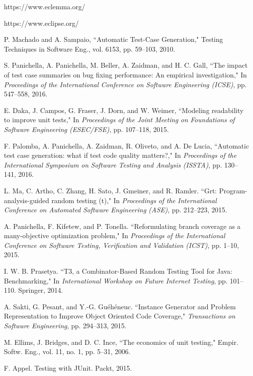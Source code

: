 \documentclass[conference]{IEEEtran}
\begin{document}
\begin{thebibliography}{15}
 https://www.eclemma.org/

 https://www.eclipse.org/

 P. Machado and A. Sampaio, ``Automatic Test-Case Generation," Testing Techniques in Software Eng., vol. 6153, pp. 59--103, 2010. 

 S. Panichella, A. Panichella, M. Beller, A. Zaidman, and H. C. Gall, ``The impact of test case summaries on bug fixing performance: An empirical investigation," In {\it Proceedings of the International Conference on Software Engineering (ICSE)}, pp. 547--558, 2016.

 E. Daka, J. Campos, G. Fraser, J. Dorn, and W. Weimer, ``Modeling readability to improve unit tests," In {\it Proceedings of the Joint Meeting on Foundations of Software Engineering (ESEC/FSE)}, pp. 107--118, 2015.

 F. Palomba, A. Panichella, A. Zaidman, R. Oliveto, and A. De Lucia, ``Automatic test case generation: what if test code quality matters?," In {\it Proceedings of the International Symposium on Software Testing and Analysis (ISSTA)}, pp. 130--141, 2016.

 L. Ma, C. Artho, C. Zhang, H. Sato, J. Gmeiner, and R. Ramler. ``Grt: Program-analysis-guided random testing (t)," In {\it Proceedings of the International Conference on Automated Software Engineering (ASE)}, pp. 212--223, 2015.

 A. Panichella, F. Kifetew, and P. Tonella. ``Reformulating branch coverage as a many-objective optimization problem," In {\it Proceedings of the International Conference on Software Testing, Verification and Validation (ICST)}, pp. 1--10, 2015. 

 I. W. B. Prasetya. ``T3, a Combinator-Based Random Testing Tool for Java: Benchmarking," In {\it International Workshop on Future Internet Testing}, pp. 101--110. Springer, 2014.

 A. Sakti, G. Pesant, and Y.-G. Gu\'{e}h\'{e}neuc. ``Instance Generator and Problem Representation to Improve Object Oriented Code Coverage," {\it Transactions on Software Engineering}, pp. 294--313, 2015.

 M. Ellims, J. Bridges, and D. C. Ince, ``The economics of unit testing," Empir. Softw. Eng., vol. 11, no. 1, pp. 5--31, 2006.

 F. Appel. Testing with JUnit. Packt, 2015.

\end{thebibliography}

\end{document}
